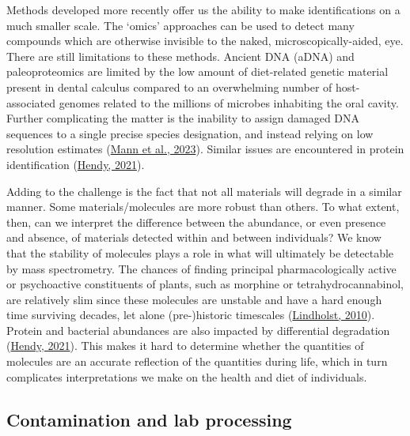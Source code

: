 \documentclass[
  b5paper,
]{book}
\begin{document}
Methods developed more recently offer us the ability to make
identifications on a much smaller scale. The `omics' approaches can be
used to detect many compounds which are otherwise invisible to the
naked, microscopically-aided, eye. There are still limitations to these
methods. Ancient DNA (aDNA) and paleoproteomics are limited by the low
amount of diet-related genetic material present in dental calculus
compared to an overwhelming number of host-associated genomes related to
the millions of microbes inhabiting the oral cavity. Further
complicating the matter is the inability to assign damaged DNA sequences
to a single precise species designation, and instead relying on low
resolution estimates (\protect\hyperlink{ref-mannHaveSomething2023}{Mann
et al., 2023}). Similar issues are encountered in protein identification
(\protect\hyperlink{ref-hendyAncientProtein2021}{Hendy, 2021}).

Adding to the challenge is the fact that not all materials will degrade
in a similar manner. Some materials/molecules are more robust than
others. To what extent, then, can we interpret the difference between
the abundance, or even presence and absence, of materials detected
within and between individuals? We know that the stability of molecules
plays a role in what will ultimately be detectable by mass spectrometry.
The chances of finding principal pharmacologically active or
psychoactive constituents of plants, such as morphine or
tetrahydrocannabinol, are relatively slim since these molecules are
unstable and have a hard enough time surviving decades, let alone
(pre-)historic timescales
(\protect\hyperlink{ref-lindholstLongTerm2010}{Lindholst, 2010}).
Protein and bacterial abundances are also impacted by differential
degradation (\protect\hyperlink{ref-hendyAncientProtein2021}{Hendy,
2021}). This makes it hard to determine whether the quantities of
molecules are an accurate reflection of the quantities during life,
which in turn complicates interpretations we make on the health and diet
of individuals.

\hypertarget{contamination-and-lab-processing}{%
\subsection{Contamination and lab
processing}\label{contamination-and-lab-processing}}
\end{document}
